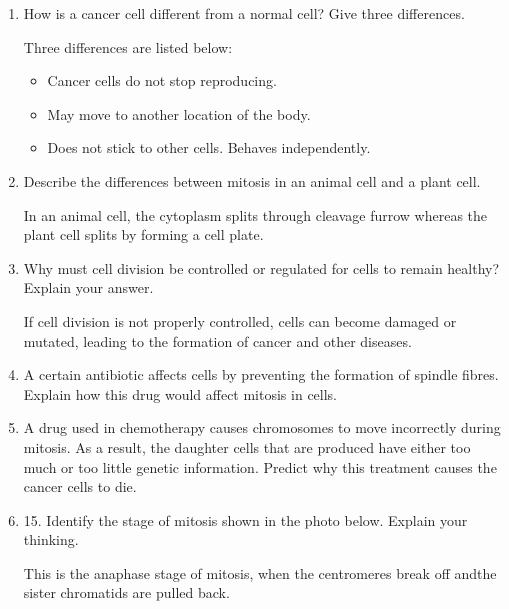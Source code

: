 \documentclass[12pt]{report}
\begin{document}
\begin{enumerate}
        \item{How is a cancer cell different from a normal cell? Give three differences.}
            \begin{solution}
                Three differences are listed below: 
                \begin{itemize}
                    \item{Cancer cells do not stop reproducing.}
                    \item{May move to another location of the body.}
                    \item{Does not stick to other cells. Behaves independently.}
                \end{itemize}
            \end{solution}

        \item{Describe the differences between mitosis in an animal cell and a plant cell.}
            \begin{solution}
                In an animal cell, the cytoplasm splits through cleavage furrow whereas the plant cell splits by forming a cell plate.
            \end{solution}

        \item{Why must cell division be controlled or regulated for cells to remain healthy? Explain your answer.}
            \begin{solution}
                If cell division is not properly controlled, cells can become damaged or mutated, leading to the formation of cancer and other diseases.
            \end{solution}

        \item{A certain antibiotic affects cells by preventing the formation of spindle fibres. Explain how this drug would affect mitosis in cells.}

        \item{A drug used in chemotherapy causes chromosomes to move incorrectly during mitosis. As a result, the daughter cells that are produced have either too much or too little genetic information. Predict why this treatment causes the cancer cells to die.}

        \item{15. Identify the stage of mitosis shown in the photo below. Explain your thinking.}
            \begin{solution}
                This is the anaphase stage of mitosis, when the centromeres break off andthe sister chromatids are pulled back.
            \end{solution}


\end{enumerate}
\end{document}
